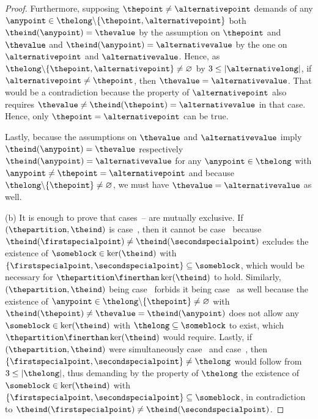 \documentclass[pdftex]{sigma}
\numberwithin{equation}{section}
\begin{document}
\begin{proof}
 Furthermore,  supposing $\thepoint\neq \alternativepoint$ demands of any $\anypoint\in\thelong\backslash \{\thepoint,\alternativepoint\}$ both $\theind(\anypoint)=\thevalue$ by the assumption on $\thepoint$ and $\thevalue$ and $\theind(\anypoint)=\alternativevalue$ by the one on $\alternativepoint$ and $\alternativevalue$. Hence, as $\thelong\backslash \{\thepoint,\alternativepoint\}\neq \varnothing$  by $3\leq |\alternativelong|$, if  $\alternativepoint\neq \thepoint$, then $\thevalue=\alternativevalue$. That would be a contradiction because the property of $\alternativepoint$ also requires $\thevalue\neq \theind(\thepoint)=\alternativevalue$ in that case. Hence, only $\thepoint=\alternativepoint$ can be true.

 Lastly, because the assumptions on $\thevalue$ and $\alternativevalue$ imply $\theind(\anypoint)=\thevalue$ respectively $\theind(\anypoint)=\alternativevalue$ for any $\anypoint\in\thelong$ with $\anypoint\neq \thepoint=\alternativepoint$ and because  $\thelong\backslash \{\thepoint\}\neq \varnothing$, we must have $\thevalue=\alternativevalue$ as well.

 (b)
 It is enough to prove that cases~\scenarioone{}--\scenariothree{} are mutually exclusive.
 If $(\thepartition,\theind)$ is case~\scenariotwo, then it cannot be case~\scenarioone{} because $\theind(\firstspecialpoint)\neq \theind(\secondspecialpoint)$ excludes the existence of $\someblock\in \ker(\theind)$ with $\{\firstspecialpoint,\secondspecialpoint\}\subseteq \someblock$, which would be necessary for  $\thepartition\finerthan\ker(\theind)$ to hold.
Similarly, $(\thepartition,\theind)$ being case~\scenariothree{} forbids it being case~\scenarioone{} as well because the existence of $\anypoint\in \thelong\backslash \{\thepoint\}\neq\varnothing$ with $\theind(\thepoint)\neq \thevalue=\theind(\anypoint)$ does not allow  any $\someblock\in\ker(\theind)$ with $\thelong\subseteq \someblock$ to exist, which $\thepartition\finerthan\ker(\theind)$ would require.
 Lastly, if~$(\thepartition,\theind)$ were  simultaneously case~\scenariotwo{} and case~\scenariothree{}, then $\{\firstspecialpoint,\secondspecialpoint\}\neq\thelong$ would follow from $3\leq |\thelong|$, thus demanding by the property of $\thelong$ the existence of $\someblock\in\ker(\theind)$ with $\{\firstspecialpoint,\secondspecialpoint\}\subseteq \someblock$, in  contradiction to $\theind(\firstspecialpoint)\neq\theind(\secondspecialpoint)$.
\end{proof}
\end{document}
